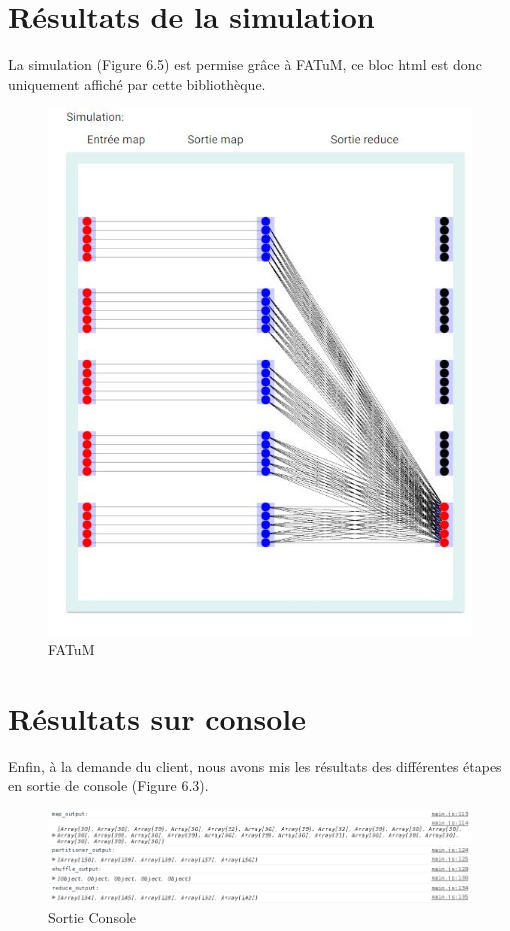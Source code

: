 \section{Résultats de la simulation}
La simulation (Figure 6.5) est permise grâce à FATuM, ce bloc html est donc uniquement affiché par cette bibliothèque.
\begin{figure}[H]
  \centering
    \includegraphics[scale=0.6]{images/resultat_simulation_3.jpg}
        \caption{FATuM}
\end{figure}
\section{Résultats sur console}
Enfin, à la demande du client, nous avons mis les résultats des différentes étapes en sortie de console (Figure 6.3).
\begin{figure}[H]
  \centering
    \includegraphics[scale=0.5]{images/resultat_console.png}
        \caption{Sortie Console}
\end{figure}